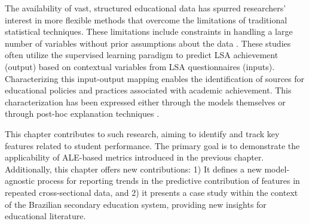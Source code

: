 The availability of vast, structured educational data has spurred researchers' interest in more flexible methods that overcome the limitations of traditional statistical techniques. These limitations include constraints in handling a large number of variables without prior assumptions about the data \cite{Martinez-Abad2018BigEducation, Masci2018StudentApproach}. These studies often utilize the supervised learning paradigm to predict \gls{LSA} achievement (output) based on contextual variables from \gls{LSA} questionnaires (inputs). Characterizing this input-output mapping enables the identification of sources for educational policies and practices associated with academic achievement. This characterization has been expressed either through the models themselves \cite{Gomes2020PresentingDataset, SilvaFilho2019DataInstitutes} or through post-hoc explanation techniques \cite{Gabriel2018ALiteracy, Schiltz2018UsingApproach}.

This chapter contributes to such research, aiming to identify and track key features related to student performance. The primary goal is to demonstrate the applicability of ALE-based metrics introduced in the previous chapter. Additionally, this chapter offers new contributions: 1) It defines a new model-agnostic process for reporting trends in the predictive contribution of features in repeated cross-sectional data, and 2) it presents a case study within the context of the Brazilian secondary education system, providing new insights for educational literature.



